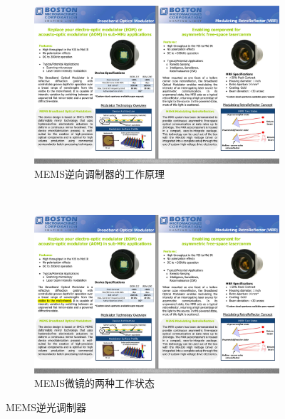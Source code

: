 %
\begin{figure}[!htbp]
	\centering
	\begin{subfigure}[c]{0.5\textwidth}
		\includegraphics[width=\textwidth]{./Img/mems-principle.pdf}
		\caption{MEMS逆向调制器的工作原理}
		\label{fig:mems-principle.pdf}
	\end{subfigure}%
	~%
	\begin{subfigure}[c]{0.5\textwidth}
		\includegraphics[width=\textwidth]{./Img/MRR-TWO-STATE.pdf}
		\caption{MEMS微镜的两种工作状态}
		\label{fig:MRR-TWO-STATE.pdf}
	\end{subfigure}
	\caption{MEMS逆光调制器}
	\label{fig:MEMS-MRR-manual}
\end{figure}

